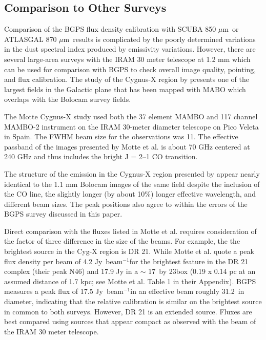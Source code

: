 \documentclass[12pt,preprint]{aastex}
\newcommand{\mum}{\ensuremath{\mu \mathrm{m}}}
\newcommand\jyb{Jy~beam$^{-1}$}
\newcommand{\bcamfwhm}{31.2\arcsec}
\begin{document}
\subsection{Comparison to Other Surveys}
\label{sec:motte}


Comparison of the BGPS flux density calibration with SCUBA 850 \mum\
or ATLASGAL 870 \mum\ results is complicated by the poorly determined
variations in the dust spectral index produced by emissivity variations.
However, there are several large-area surveys with the IRAM 30 meter
telescope at 1.2 mm which can be used for comparison with BGPS to
check overall image quality, pointing, and flux calibration.  The study
of the Cygnus-X region by \citet{motte07} presents one of the largest
fields in the Galactic plane that has been mapped with MABO which overlaps
with the Bolocam survey fields.

The Motte Cygnus-X study used both the 37 element MAMBO and 117 channel
MAMBO-2 instrument on the IRAM 30-meter diameter telescope on Pico Veleta
in Spain.   The FWHM beam size for the observations was 11\arcsec .
The effective passband of the images presented by Motte et al.
is about 70 GHz centered at 240 GHz and thus includes the bright
J = 2--1 CO transition.

The structure of the emission in the Cygnus-X region presented by
\citet{motte07} appear nearly identical to the 1.1 mm Bolocam images
of the same field despite the inclusion of the CO line, the slightly
longer (by about 10\%) longer effective wavelength, and different beam
sizes.   The peak positions also agree to within the errors of the
BGPS survey discussed in this paper.

Direct comparison with the fluxes listed in Motte et al. requires
consideration of the factor of three difference in the size of the beams.
For example, the the brightest source in the Cyg-X region is DR 21.
While Motte et al. quote a peak flux density per beam of 4.2 \jyb for
the brightest feature in the DR 21 complex (their peak N46) and 17.9 Jy
in a $\sim$ 17\arcsec\ by 23\arcsec box (0.19 x 0.14 pc at an assumed
distance of 1.7 kpc; see Motte et al. Table 1 in their Appendix).
BGPS measures a peak flux of 17.5 \jyb in an effective beam roughly
\bcamfwhm\ in diameter, indicating that the relative calibration is
similar on the brightest source in common to both surveys.   However,
DR 21 is an extended source.  Fluxes are best compared using sources
that appear compact as observed with the beam of the IRAM 30 meter
telescope.
\end{document}
